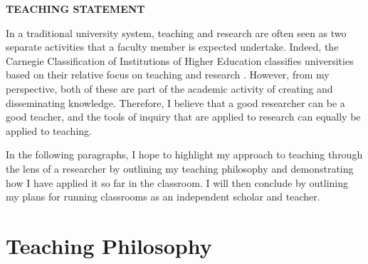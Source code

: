 \documentclass[12pt]{article}
\begin{document}
 \sloppy %
\begin{center}
{\large \uppercase{\textbf{Teaching Statement}}}
\end{center}

In a traditional university system, teaching and research are often seen as two separate activities that a faculty member is expected undertake. Indeed, the Carnegie Classification of Institutions of Higher Education classifies universities based on their relative focus on teaching and research \cite{carnegie1994classification}. However, from my perspective, both of these are part of the academic activity of creating and disseminating knowledge. Therefore, I believe that a good researcher can be a good teacher, and the tools of inquiry that are applied to research can equally be applied to teaching. 

In the following paragraphs, I hope to highlight my approach to teaching through the lens of a researcher by outlining my teaching philosophy and demonstrating how I have applied it so far in the classroom. I will then conclude by outlining my plans for running classrooms as an independent scholar and teacher. 

\section*{Teaching Philosophy}


 

\end{document}
